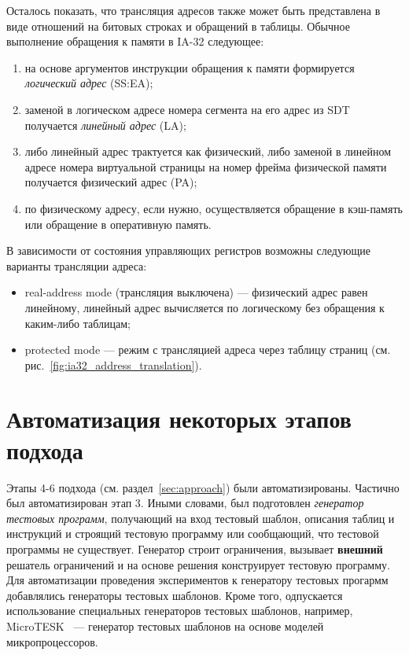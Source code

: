 Осталось показать, что трансляция адресов также может быть представлена в виде
отношений на битовых строках и обращений в таблицы. Обычное выполнение
обращения к памяти в IA-32 следующее:
\begin{enumerate}
    \item на основе аргументов инструкции обращения к памяти формируется \emph{логический адрес} (SS:EA);
    \item заменой в логическом адресе номера сегмента на его адрес из SDT получается \emph{линейный адрес} (LA);
    \item либо линейный адрес трактуется как физический, либо заменой в линейном адресе номера виртуальной страницы на номер фрейма физической памяти получается физический адрес (PA);
    \item по физическому адресу, если нужно, осуществляется обращение в кэш-память или обращение в оперативную память.
\end{enumerate}

В зависимости от состояния управляющих регистров возможны следующие варианты трансляции адреса:
\begin{itemize}
  \item real-address mode (трансляция выключена) --- физический адрес равен линейному, линейный адрес вычисляется по логическому без обращения к каким-либо таблицам;
  \item protected mode --- режим с трансляцией адреса через таблицу страниц (см. рис.~\ref{fig:ia32_address_translation}).
\end{itemize}



\section{Автоматизация некоторых этапов подхода}

Этапы 4-6 подхода (см. раздел~\ref{sec:approach}) были автоматизированы. Частично был автоматизирован этап 3. Иными словами, был подготовлен \emph{генератор тестовых программ}, получающий на вход тестовый шаблон, описания таблиц и инструкций и строящий тестовую программу или сообщающий, что тестовой программы не существует. Генератор строит ограничения, вызывает \textbf{внешний} решатель ограничений и на основе решения конструирует тестовую программу. Для автоматизации проведения экспериментов к генератору тестовых прогармм добавлялись генераторы тестовых шаблонов. Кроме того, одпускается использование специальных генераторов тестовых шаблонов, например,\\ MicroTESK~\cite{MicroTESK} --- генератор тестовых шаблонов на основе моделей микропроцессоров.

